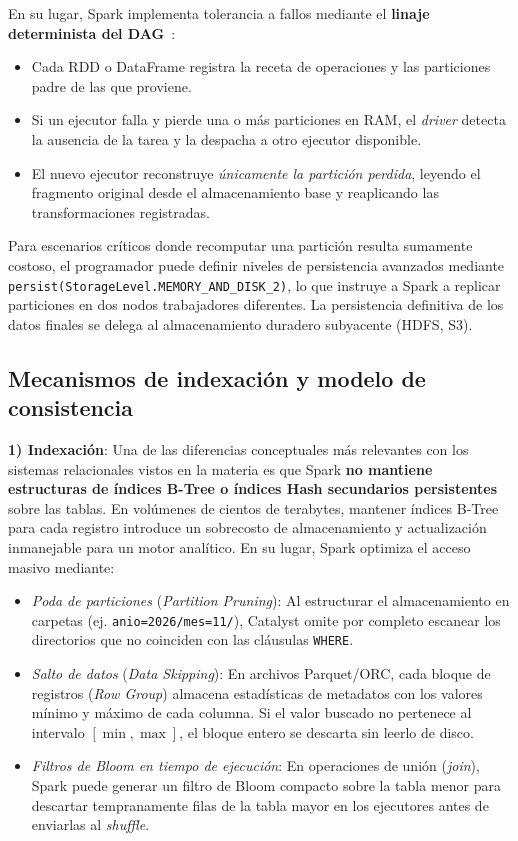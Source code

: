 \documentclass[conference,a4paper]{IEEEtran}
\begin{document}
En su lugar, Spark implementa tolerancia a fallos mediante el \textbf{linaje determinista del DAG}~\cite{zaharia2012rdd}:
\begin{itemize}
\item Cada RDD o DataFrame registra la receta de operaciones y las particiones padre de las que proviene.
\item Si un ejecutor falla y pierde una o más particiones en RAM, el \textit{driver} detecta la ausencia de la tarea y la despacha a otro ejecutor disponible.
\item El nuevo ejecutor reconstruye \textit{únicamente la partición perdida}, leyendo el fragmento original desde el almacenamiento base y reaplicando las transformaciones registradas.
\end{itemize}

Para escenarios críticos donde recomputar una partición resulta sumamente costoso, el programador puede definir niveles de persistencia avanzados mediante \texttt{persist(StorageLevel.MEMORY\_AND\_DISK\_2)}, lo que instruye a Spark a replicar particiones en dos nodos trabajadores diferentes. La persistencia definitiva de los datos finales se delega al almacenamiento duradero subyacente (HDFS, S3).

\subsection{Mecanismos de indexación y modelo de consistencia}

\textbf{1) Indexación}: Una de las diferencias conceptuales más relevantes con los sistemas relacionales vistos en la materia es que Spark \textbf{no mantiene estructuras de índices B-Tree o índices Hash secundarios persistentes} sobre las tablas. En volúmenes de cientos de terabytes, mantener índices B-Tree para cada registro introduce un sobrecosto de almacenamiento y actualización inmanejable para un motor analítico. En su lugar, Spark optimiza el acceso masivo mediante:
\begin{itemize}
\item \textit{Poda de particiones} (\textit{Partition Pruning}): Al estructurar el almacenamiento en carpetas (ej. \texttt{anio=2026/mes=11/}), Catalyst omite por completo escanear los directorios que no coinciden con las cláusulas \texttt{WHERE}.
\item \textit{Salto de datos} (\textit{Data Skipping}): En archivos Parquet/ORC, cada bloque de registros (\textit{Row Group}) almacena estadísticas de metadatos con los valores mínimo y máximo de cada columna. Si el valor buscado no pertenece al intervalo $[\min, \max]$, el bloque entero se descarta sin leerlo de disco.
\item \textit{Filtros de Bloom en tiempo de ejecución}: En operaciones de unión (\textit{join}), Spark puede generar un filtro de Bloom compacto sobre la tabla menor para descartar tempranamente filas de la tabla mayor en los ejecutores antes de enviarlas al \textit{shuffle}.
\end{itemize}
\end{document}
